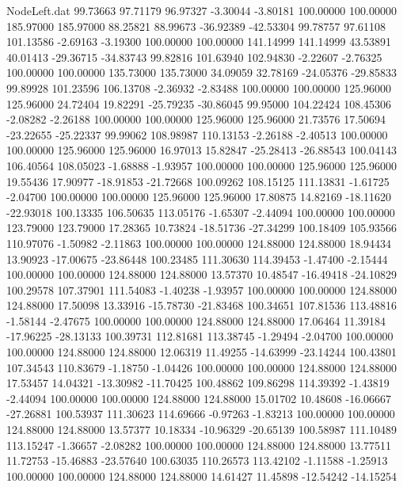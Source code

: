 \begin{filecontents}{NodeLeft.dat}
  99.73663   97.71179   96.97327    -3.30044   -3.80181  100.00000  100.00000  185.97000  185.97000   88.25821   88.99673  -36.92389  -42.53304
  99.78757   97.61108  101.13586    -2.69163   -3.19300  100.00000  100.00000  141.14999  141.14999   43.53891   40.01413  -29.36715  -34.83743
  99.82816  101.63940  102.94830    -2.22607   -2.76325  100.00000  100.00000  135.73000  135.73000   34.09059   32.78169  -24.05376  -29.85833
  99.89928  101.23596  106.13708    -2.36932   -2.83488  100.00000  100.00000  125.96000  125.96000   24.72404   19.82291  -25.79235  -30.86045
  99.95000  104.22424  108.45306    -2.08282   -2.26188  100.00000  100.00000  125.96000  125.96000   21.73576   17.50694  -23.22655  -25.22337
  99.99062  108.98987  110.13153    -2.26188   -2.40513  100.00000  100.00000  125.96000  125.96000   16.97013   15.82847  -25.28413  -26.88543
 100.04143  106.40564  108.05023    -1.68888   -1.93957  100.00000  100.00000  125.96000  125.96000   19.55436   17.90977  -18.91853  -21.72668
 100.09262  108.15125  111.13831    -1.61725   -2.04700  100.00000  100.00000  125.96000  125.96000   17.80875   14.82169  -18.11620  -22.93018
 100.13335  106.50635  113.05176    -1.65307   -2.44094  100.00000  100.00000  123.79000  123.79000   17.28365   10.73824  -18.51736  -27.34299
 100.18409  105.93566  110.97076    -1.50982   -2.11863  100.00000  100.00000  124.88000  124.88000   18.94434   13.90923  -17.00675  -23.86448
 100.23485  111.30630  114.39453    -1.47400   -2.15444  100.00000  100.00000  124.88000  124.88000   13.57370   10.48547  -16.49418  -24.10829
 100.29578  107.37901  111.54083    -1.40238   -1.93957  100.00000  100.00000  124.88000  124.88000   17.50098   13.33916  -15.78730  -21.83468
 100.34651  107.81536  113.48816    -1.58144   -2.47675  100.00000  100.00000  124.88000  124.88000   17.06464   11.39184  -17.96225  -28.13133
 100.39731  112.81681  113.38745    -1.29494   -2.04700  100.00000  100.00000  124.88000  124.88000   12.06319   11.49255  -14.63999  -23.14244
 100.43801  107.34543  110.83679    -1.18750   -1.04426  100.00000  100.00000  124.88000  124.88000   17.53457   14.04321  -13.30982  -11.70425
 100.48862  109.86298  114.39392    -1.43819   -2.44094  100.00000  100.00000  124.88000  124.88000   15.01702   10.48608  -16.06667  -27.26881
 100.53937  111.30623  114.69666    -0.97263   -1.83213  100.00000  100.00000  124.88000  124.88000   13.57377   10.18334  -10.96329  -20.65139
 100.58987  111.10489  113.15247    -1.36657   -2.08282  100.00000  100.00000  124.88000  124.88000   13.77511   11.72753  -15.46883  -23.57640
 100.63035  110.26573  113.42102    -1.11588   -1.25913  100.00000  100.00000  124.88000  124.88000   14.61427   11.45898  -12.54242  -14.15254

\end{filecontents}
